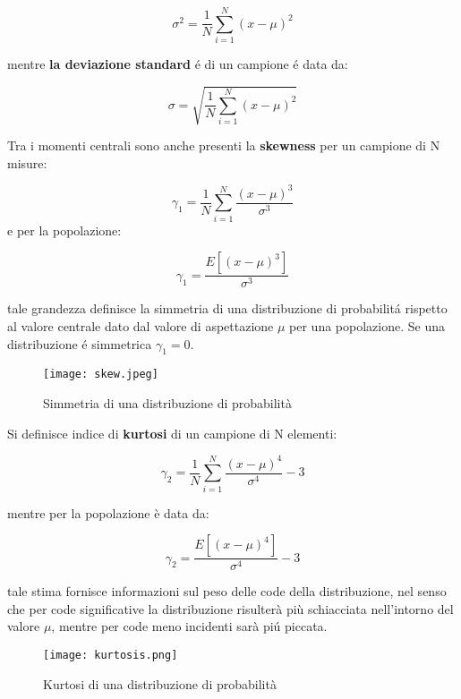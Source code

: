\begin{equation}
	\sigma^2 = \dfrac{1}{N}\sum_{i=1}^N(x- \mu)^2
\end{equation}

mentre \textbf{la deviazione standard} \'{e} di un campione \'{e} data da:

\begin{equation}
	\sigma = \sqrt{\dfrac{1}{N}\sum_{i=1}^N(x- \mu)^2}
\end{equation}

Tra i momenti centrali sono anche presenti la \textbf{skewness} per un campione di N misure:

\begin{equation}
	\gamma_{1} = \dfrac{1}{N}\sum_{i=1}^N \dfrac{(x-\mu)^3}{\sigma^3}
\end{equation}
 e per la popolazione:
 
 \begin{equation}
 	\gamma_{1} = \dfrac{E[(x-\mu)^3]}{\sigma^3}
 \end{equation}
 
 tale grandezza definisce la simmetria di una distribuzione di probabilit\'{a} rispetto al valore centrale dato dal valore di aspettazione $\mu$ per una popolazione. Se una distribuzione \'{e} simmetrica $\gamma_{1} = 0 $.
 
  
\begin{figure}[!ht]

\texttt{[image: skew.jpeg]}	
\centering
\caption{Simmetria di una distribuzione di probabilit\`{a}}
\end{figure}


Si definisce indice di \textbf{kurtosi} di un campione di N elementi:

\begin{equation}
	\gamma_{2} = \dfrac{1}{N}\sum_{i=1}^N\dfrac{(x-\mu)^4}{\sigma^4}-3
\end{equation}

mentre per la popolazione \`{e} data da:

\begin{equation}
	\gamma_2 = \dfrac{E[(x-\mu)^4]}{\sigma^4} -3
\end{equation}

tale stima fornisce informazioni sul peso delle code della distribuzione, nel senso che per code significative la distribuzione risulter\`{a} pi\`{u} schiacciata nell'intorno del valore $\mu$, mentre per code meno incidenti sar\`{a} pi\'{u} piccata.


\begin{figure}[!ht]

\texttt{[image: kurtosis.png]}	
\centering
\caption{Kurtosi di una distribuzione di probabilit\`{a}}
\end{figure}



